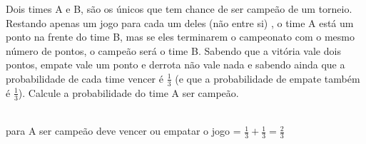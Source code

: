 \begin{ex}
Dois times A e B, são os únicos que tem chance de ser campeão de um torneio. Restando apenas um jogo para cada um deles (não entre si) , o time A está um ponto na frente do time B, mas se eles terminarem o campeonato com o mesmo número de pontos, o campeão será o time B. Sabendo que a vitória vale dois pontos, empate vale um ponto e derrota não vale nada e sabendo ainda que a probabilidade de cada time vencer é $\frac{1}{3}$ (e que a probabilidade de empate também é  $\frac{1}{3}$). Calcule a probabilidade do time A ser campeão.
  \begin{sol}
    \phantom{A}\\
    para A ser campeão deve vencer ou empatar o jogo = $\frac{1}{3}+\frac{1}{3}=\frac{2}{3}$
  \end{sol}
\end{ex}
